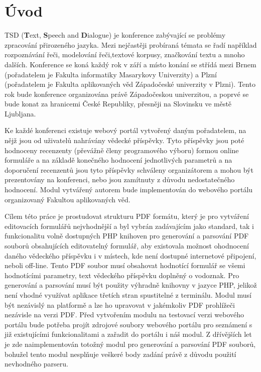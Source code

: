 \chapter{Úvod}
TSD (\textbf{T}ext, \textbf{S}peech and \textbf{D}ialogue) je konference zabývající se problémy zpracování přirozeného jazyka. Mezi nejčastěji probíraná témata se řadí například rozpoznávání řeči, modelování řeči,textové korpusy, značkování textu a mnoho dalších. Konference se koná každý rok v září a místo konání se střídá mezi Brnem (pořadatelem je Fakulta informatiky Masarykovy Univerzity) a Plzní (pořadatelem je Fakulta aplikovaných věd Západočeské univerzity v Plzni). Tento rok bude konference organizována právě Západočeskou univerzitou, a poprvé se bude konat za hranicemi České Republiky, přesněji na Slovinsku ve městě Ljubljana.
\par
 Ke každé konferenci existuje webový portál vytvořený daným pořadatelem, na nějž jsou od uživatelů nahrávány vědecké příspěvky. Tyto příspěvky jsou poté hodnoceny recenzenty (převážně členy programového výboru) formou online formuláře a na základě konečného hodnocení jednotlivých parametrů a na doporučení recenzentů jsou tyto příspěvky schváleny organizátorem a mohou být prezentovány na konferenci, nebo jsou zamítnuty z důvodu nedostatečného hodnocení. Modul vytvářený autorem bude implementován do webového portálu organizovaný Fakultou aplikovaných věd.
\par
Cílem této práce je prostudovat strukturu PDF formátu, který je pro vytváření editovacích formulářů nejvhodnější a byl vybrán zadávajícím jako standard, tak i funkcionalitu volně dostupných PHP knihoven pro generování a parsování PDF souborů obsahujících editovatelný formulář, aby existovala možnost ohodnocení daného vědeckého příspěvku i v místech, kde není dostupné internetové připojení, neboli off-line. Tento PDF soubor musí obsahovat hodnotící formulář se všemi hodnotícími parametry, text vědeckého příspěvku doplněný o vodoznak. Pro generování a parsování musí být použity výhradně knihovny v jazyce PHP, jelikož není vhodné využívat aplikace třetích stran spustitelné z terminálu. Modul musí být nezávislý na platformě a lze ho upravovat v jakémkoliv PDF prohlížeči nezávisle na verzi PDF. Před vytvořením modulu na testovací verzi webového portálu bude potřeba projít zdrojové soubory webového portálu pro seznámení s již existujícími funkcionalitami a zařadit do portálu i náš modul. Z dřívějších let je zde naimplementován totožný modul pro generování a parsování PDF souborů, bohužel tento modul nesplňuje veškeré body zadání právě z důvodu použití nevhodného parseru.
 